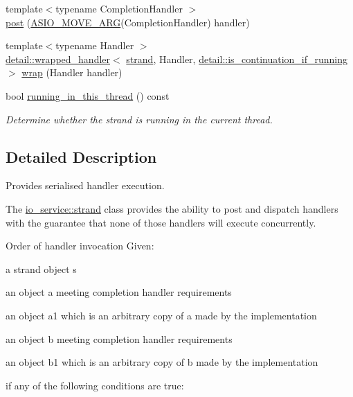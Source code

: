 \begin{DoxyCompactItemize}
{\footnotesize template$<$typename Completion\+Handler $>$ }\\\hyperlink{classasio_1_1io__service_1_1strand_a2fe06e22a81ff3e60829b9bc904bd598}{post} (\hyperlink{group__async__read_ga6d72a97784dde9476c6d93b8904a4967}{A\+S\+I\+O\+\_\+\+M\+O\+V\+E\+\_\+\+A\+R\+G}(Completion\+Handler) handler)
\item 
{\footnotesize template$<$typename Handler $>$ }\\\hyperlink{classasio_1_1detail_1_1wrapped__handler}{detail\+::wrapped\+\_\+handler}$<$ \hyperlink{classasio_1_1io__service_1_1strand}{strand}, Handler, \hyperlink{structasio_1_1detail_1_1is__continuation__if__running}{detail\+::is\+\_\+continuation\+\_\+if\+\_\+running} $>$ \hyperlink{classasio_1_1io__service_1_1strand_a7b2fe933bbae0d485f26804e26261f87}{wrap} (Handler handler)
\item 
bool \hyperlink{classasio_1_1io__service_1_1strand_ab03b1b47f66c80ca7f8589060f55ec4a}{running\+\_\+in\+\_\+this\+\_\+thread} () const 
\begin{DoxyCompactList}\small\item\em Determine whether the strand is running in the current thread. \end{DoxyCompactList}\end{DoxyCompactItemize}


\subsection{Detailed Description}
Provides serialised handler execution. 

The \hyperlink{classasio_1_1io__service_1_1strand}{io\+\_\+service\+::strand} class provides the ability to post and dispatch handlers with the guarantee that none of those handlers will execute concurrently.

\begin{DoxyParagraph}{Order of handler invocation}
Given\+:
\end{DoxyParagraph}
\begin{DoxyItemize}
\item a strand object {\ttfamily s} \end{DoxyItemize}
\begin{DoxyItemize}
\item an object {\ttfamily a} meeting completion handler requirements\end{DoxyItemize}
\begin{DoxyItemize}
\item an object {\ttfamily a1} which is an arbitrary copy of {\ttfamily a} made by the implementation\end{DoxyItemize}
\begin{DoxyItemize}
\item an object {\ttfamily b} meeting completion handler requirements\end{DoxyItemize}
\begin{DoxyItemize}
\item an object {\ttfamily b1} which is an arbitrary copy of {\ttfamily b} made by the implementation\end{DoxyItemize}
if any of the following conditions are true\+:


